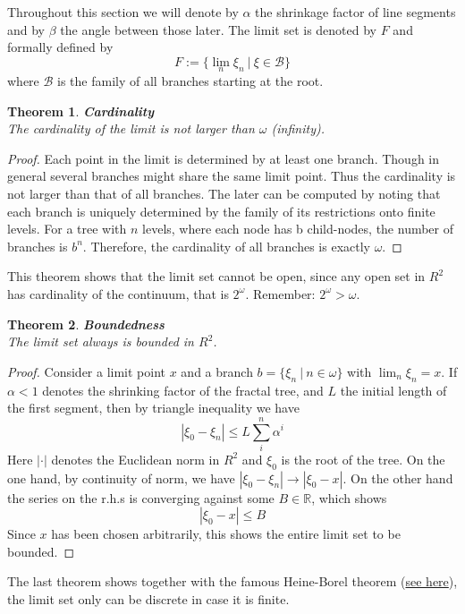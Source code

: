 \documentclass[17pt]{extarticle}
\newtheorem*{theorem*}{Theorem}
\begin{document}
Throughout this section we will denote by $\alpha$ the shrinkage factor of line segments and by $\beta$ the angle between those later. The limit set is denoted by $F$ and formally defined by
$$
F:=\{\lim_{n}\xi_n \ | \ \xi\in \mathcal{B}\}
$$
where $\mathcal{B}$ is the family of all branches starting at the root.
	
\begin{theorem*}
	\textbf{Cardinality}\\
	The cardinality of the limit is not larger than $\omega$ (infinity).
\end{theorem*}
\begin{proof}
Each point in the limit is determined by at least one branch. Though in general several branches might share the same limit point. Thus the cardinality is not larger than that of all branches. The later can be computed by noting that each branch is uniquely determined by the family of its restrictions onto finite levels. For a tree with $n$ levels, where each node has b child-nodes, the number of branches is $b^n$. Therefore, the cardinality of all branches is exactly $\omega$.
\end{proof}

This theorem shows that the limit set cannot be open, since any open set in $R^2$ has cardinality of the continuum, that is $2^{\omega}$. Remember: $2^{\omega}>\omega$.

\begin{theorem*}
	\textbf{Boundedness}\\
	The limit set always is bounded in $R^2$.
\end{theorem*}
\begin{proof}
Consider a limit point $x$ and a branch $b=\{\xi_n \ | \ n\in\omega\}$ with $\lim_n \xi_n = x$. If $\alpha<1$ denotes the shrinking factor of the fractal tree, and $L$ the initial length of the first segment, then by triangle inequality we have
$$
|\xi_0 - \xi_n|\leq L\sum_i^n \alpha^i
$$
Here $|\cdot|$ denotes the Euclidean norm in $R^2$ and $\xi_0$ is the root of the tree.
On the one hand, by continuity of norm, we have $|\xi_0-\xi_n| \rightarrow |\xi_0-x|$. On the other hand the series on the r.h.s is converging against some $B\in\mathbb{R}$,
which shows
$$
|\xi_0 - x|\leq B
$$
Since $x$ has been chosen arbitrarily, this shows the entire limit set to be bounded.
\end{proof}

The last theorem shows together with the famous Heine-Borel theorem (\href{https://en.wikipedia.org/wiki/Heine\%E2\%80\%93Borel_theorem}{see here}), the limit set only can be discrete in case it is finite.
\end{document}
